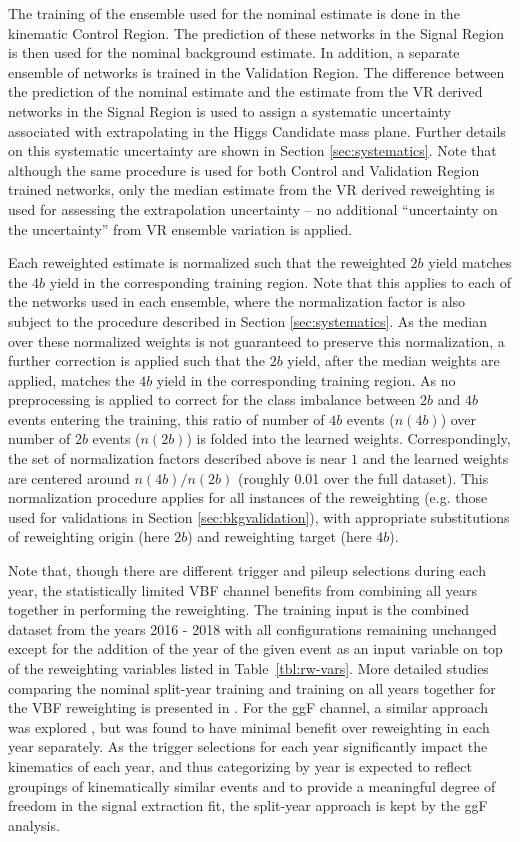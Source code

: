 The training of the ensemble used for the nominal estimate is done in the kinematic
Control Region. The prediction of these networks in the Signal Region is then used
for the nominal background estimate. In addition, a separate ensemble of networks is 
trained in the Validation Region. The difference between the prediction of the nominal 
estimate and the estimate from the VR derived networks in the Signal Region is used to 
assign a systematic uncertainty associated with extrapolating in the Higgs Candidate
mass plane. Further details on this systematic uncertainty are shown in Section \ref{sec:systematics}.
Note that although the same procedure is used for both Control and Validation Region trained 
networks, only the median estimate from the VR derived reweighting is used for assessing the 
extrapolation uncertainty -- no additional ``uncertainty on the uncertainty'' from 
VR ensemble variation is applied.

Each reweighted estimate is normalized such that the reweighted $2b$ yield matches the $4b$ 
yield in the corresponding training region. Note that this applies to each of the networks 
used in each ensemble, where the normalization factor is also subject to the procedure described 
in Section \ref{sec:systematics}. As the median over these normalized weights is not guaranteed 
to preserve this normalization, a further correction is applied such that the $2b$ yield, after 
the median weights are applied, matches the $4b$ yield in the corresponding training region. As no 
preprocessing is applied to correct for the class imbalance between $2b$ and $4b$ events entering 
the training, this ratio of number of $4b$ events ($n(4b)$) over number of $2b$ events ($n(2b)$) is 
folded into the learned weights. Correspondingly, the set of normalization factors described above is 
near $1$ and the learned weights are centered around $n(4b) / n(2b)$ (roughly 0.01 over the full dataset). 
This normalization procedure applies for all instances of the reweighting (e.g. those used for validations 
in Section \ref{sec:bkgvalidation}), with appropriate substitutions of reweighting origin 
(here $2b$) and reweighting target (here $4b$).

Note that, though there are different trigger and pileup selections during each year, the 
statistically limited VBF channel benefits from combining all years together in performing the 
reweighting. The training input is the combined dataset from the years 2016 - 2018 with all configurations remaining unchanged except for the addition of the year of the given event as an input variable on top of the reweighting variables listed in Table~\ref{tbl:rw-vars}. More detailed studies comparing the nominal split-year training and training on all years together for the VBF reweighting is presented in . For the ggF channel, a similar approach was explored 
, but was found to have minimal benefit over reweighting in each year separately. 
As the trigger selections for each year significantly impact the kinematics of each year, 
and thus categorizing by year is expected to reflect groupings of kinematically similar events and 
to provide a meaningful degree of freedom in the signal extraction fit, the split-year approach is
kept by the ggF analysis.

